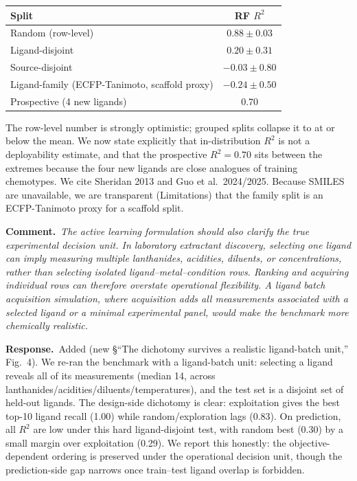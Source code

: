\documentclass[11pt]{article}
\newcommand{\rev}[1]{\begingroup\itshape\color{gray}#1\endgroup}
\newcommand{\resp}{\par\noindent\textbf{Response.}\ }
\newcommand{\cmt}[1]{\par\vspace{4pt}\noindent\textbf{Comment.}\ \rev{#1}\par\vspace{2pt}}
\begin{document}
\begin{center}\small
\begin{tabular}{lc}
\toprule
Split & RF $R^2$ \\ \midrule
Random (row-level) & $0.88\pm0.03$ \\
Ligand-disjoint & $0.20\pm0.31$ \\
Source-disjoint & $-0.03\pm0.80$ \\
Ligand-family (ECFP-Tanimoto, scaffold proxy) & $-0.24\pm0.50$ \\
Prospective (4 new ligands) & $0.70$ \\
\bottomrule
\end{tabular}
\end{center}

\noindent The row-level number is strongly optimistic; grouped splits collapse it to at
or below the mean. We now state explicitly that in-distribution $R^2$ is not a
deployability estimate, and that the prospective $R^2=0.70$ sits between the extremes
because the four new ligands are close analogues of training chemotypes. We cite
Sheridan 2013 and Guo et al.\ 2024/2025. Because SMILES are unavailable, we are
transparent (Limitations) that the family split is an ECFP-Tanimoto proxy for a
scaffold split.

\cmt{The active learning formulation should also clarify the true experimental decision
unit. In laboratory extractant discovery, selecting one ligand can imply measuring
multiple lanthanides, acidities, diluents, or concentrations, rather than selecting
isolated ligand--metal--condition rows. Ranking and acquiring individual rows can
therefore overstate operational flexibility. A ligand batch acquisition simulation,
where acquisition adds all measurements associated with a selected ligand or a minimal
experimental panel, would make the benchmark more chemically realistic.}
\resp Added (new \S``The dichotomy survives a realistic ligand-batch unit,'' Fig.~4). We
re-ran the benchmark with a ligand-batch unit: selecting a ligand reveals all of its
measurements (median 14, across lanthanides/acidities/diluents/temperatures), and the
test set is a disjoint set of held-out ligands. The design-side dichotomy is clear:
exploitation gives the best top-10 ligand recall (1.00) while random/exploration lags
(0.83). On prediction, all $R^2$ are low under this hard ligand-disjoint test, with
random best (0.30) by a small margin over exploitation (0.29). We report this honestly:
the objective-dependent ordering is preserved under the operational decision unit,
though the prediction-side gap narrows once train--test ligand overlap is forbidden.
\end{document}
